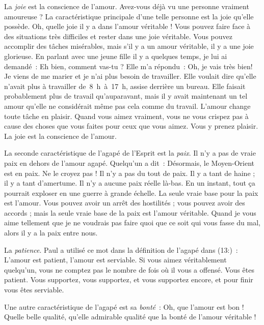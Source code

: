 La \emph{joie} est la conscience de l'amour.
 Avez-vous déjà vu une
 personne vraiment amoureuse ?
 La caractéristique principale d'une telle personne est la joie
 qu'elle possède. Oh, quelle joie il y a dans l'amour véritable !
 Vous pouvez faire face à des situations très difficiles
 et rester dans une joie véritable. Vous pouvez accomplir
 des tâches misérables, mais s'il y a un amour véritable,
 il y a une joie glorieuse. En parlant avec une jeune fille
 il y a quelques temps, je lui ai demandé~:
 \og Eh bien, comment vas-tu ? \fg{} Elle m'a répondu~:
 \og Oh, je vais très bien! Je viens de me marier et je n'ai plus besoin
 de travailler. \fg{}
 Elle voulait dire qu'elle n'avait plus à travailler de~8~h~à~17~h,
 assise derrière un bureau. Elle faisait probablement plus de travail
 qu'auparavant, mais il y avait maintenant un tel amour
 qu'elle ne considérait même pas cela comme du travail.
 L'amour change toute tâche en plaisir. Quand vous aimez vraiment,
 vous ne vous crispez pas à cause des choses que vous faites
 pour ceux que vous aimez. Vous y prenez plaisir.
 La joie est la conscience de l'amour.

La seconde caractéristique de l'agapé de l'Esprit est la \emph{paix}.
 Il n'y a pas de vraie paix en dehors de l'amour agapé.
 Quelqu'un a dit~: \og Désormais, le Moyen-Orient est en paix. \fg{}
 Ne le croyez pas ! Il n'y a pas du tout de paix.
 Il y a tant de haine ; il y a tant d'amertume.
 Il n'y a aucune paix réelle là-bas. En un instant, tout ça pourrait
 exploser en une guerre à grande échelle.
 La seule vraie base pour la paix est l'amour.
 Vous pouvez avoir un arrêt des hostilités ; vous pouvez avoir des accords ;
 mais la seule vraie base de la paix est l'amour véritable.
 Quand je vous aime tellement que je ne voudrais pas faire
 quoi que ce soit qui vous fasse du mal, alors il y a la paix entre nous.

La \emph{patience}. Paul a utilisé ce mot dans la définition de l'agapé
 dans (13:)~:
 \og L'amour est patient, l'amour est serviable. \fg{}
 Si vous aimez véritablement quelqu'un, vous ne comptez pas
 le nombre de fois où il vous a offensé. Vous êtes patient.
 Vous supportez, vous supportez, et vous supportez encore,
 et pour finir vous êtes serviable.

Une autre caractéristique de l'agapé est sa \emph{bonté}~:
 Oh, que l'amour est bon ! Quelle belle qualité,
 qu'elle admirable qualité que la bonté de l'amour véritable !

